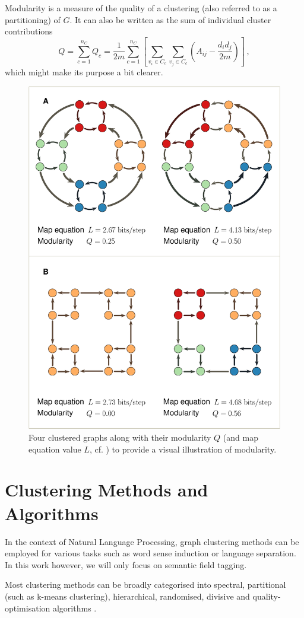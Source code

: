 \documentclass[12pt, a4paper]{article}
\begin{document}
  Modularity is a measure of the quality of a clustering (also referred to as a partitioning) of $G$. It can also be written as the sum of individual cluster contributions
  $$Q = \sum_{c=1}^{n_C} Q_c = \frac{1}{2m} \sum_{c=1}^{n_C} \left[\sum_{v_i \in C_c} \sum_{v_j \in C_c} \left(A_{ij} - \frac{d_i d_j}{2m}\right)\right]\,,$$
  which might make its purpose a bit clearer.

  \begin{figure}[H]
    \centering
    \includegraphics[width=0.5\linewidth]{figures/nice-modularity.eps}
    \caption{Four clustered graphs along with their modularity $Q$ (and map equation value $L$, cf. \cite{mapequation}) to provide a visual illustration of modularity.}
  \end{figure}

  \section{Clustering Methods and Algorithms}
  In the context of Natural Language Processing, graph clustering methods can be employed for various tasks such as word sense induction or language separation.
  In this work however, we will only focus on semantic field tagging.

  Most clustering methods can be broadly categorised into spectral, partitional (such as k-means clustering), hierarchical, randomised, divisive and quality-optimisation algorithms \parencite{fortunato}.
\end{document}
